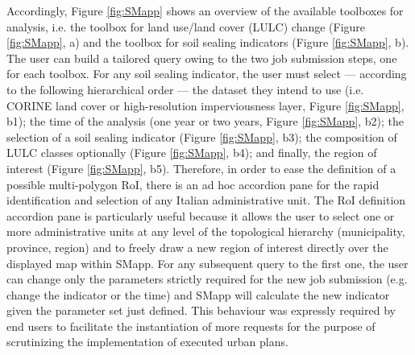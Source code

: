 \documentclass[APA,LATO1COL,doublespace]{WileyNJD-v2}
\begin{document}
Accordingly, Figure \ref{fig:SMapp} shows an overview of the available toolboxes for analysis, i.e. the toolbox for land use/land cover (LULC) change (Figure \ref{fig:SMapp}, a) and the toolbox for soil sealing indicators (Figure \ref{fig:SMapp}, b).
The user can build a tailored query owing to the two job submission steps, one for each toolbox. 
For any soil sealing indicator, the user must select --- according to the following hierarchical order --- the dataset they intend to use (i.e. CORINE land cover or high-resolution imperviousness layer, Figure \ref{fig:SMapp}, b1); the time of the analysis (one year or two years, Figure \ref{fig:SMapp}, b2); the selection of a soil sealing indicator (Figure \ref{fig:SMapp}, b3); the composition of LULC classes optionally (Figure \ref{fig:SMapp}, b4); and finally, the region of interest (Figure \ref{fig:SMapp}, b5). Therefore, in order to ease the definition of a possible multi-polygon RoI, there is an ad hoc accordion pane for the rapid identification and selection of any Italian administrative unit.
The RoI definition accordion pane is particularly useful because it allows the user to select one or more administrative units at any level of the topological hierarchy (municipality, province, region) and to freely draw a new region of interest directly over the displayed map within SMapp.
For any subsequent query to the first one, the user can change only the parameters strictly required for the new job submission (e.g. change the indicator or the time) and SMapp will calculate the new indicator given the parameter set just defined. 
This behaviour was expressly required by end users to facilitate the instantiation of more requests for the purpose of scrutinizing the implementation of executed urban plans.
\end{document}
